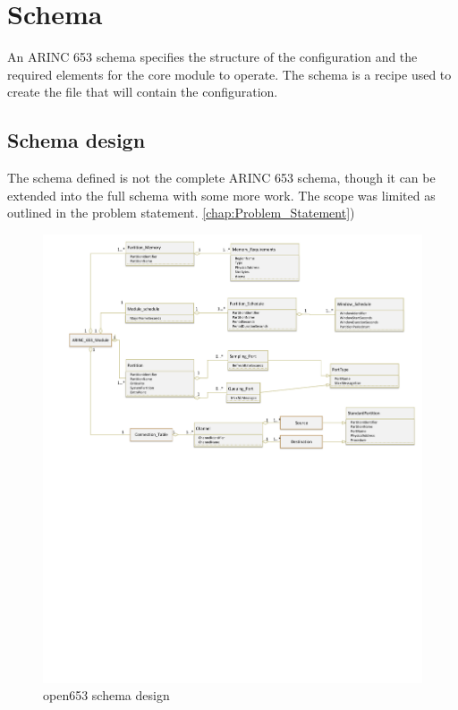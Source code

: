 \section{Schema}
\label{sec:design_schema}
An ARINC 653 schema specifies the structure 
of the configuration and the required elements 
for the core module to operate.
The schema is a recipe used to create the file 
that will contain the configuration.

\subsection{Schema design}

The schema defined is not the complete 
ARINC 653 schema, though it can be extended 
into the full schema with some more work. 
The scope was limited as outlined in the
problem statement. \ref{chap:Problem_Statement}) 

\begin{figure}[H]	\includegraphics[clip=true,trim=0cm 20cm 0cm 0cm,width=\linewidth,keepaspectratio]{figures/open653schema.pdf}
	\caption{open653 schema design}
	\label{fig:open653schema}
\end{figure}

